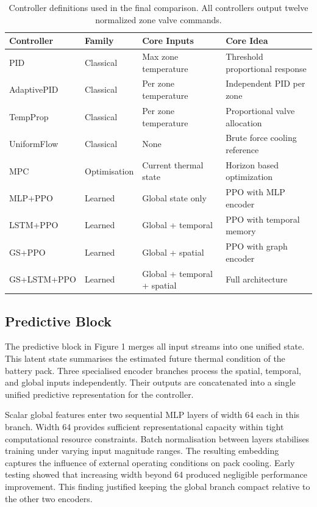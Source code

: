 \documentclass[twocolumn]{article}
\begin{document}
\begin{table}[!tb]
\centering
\caption{Controller definitions used in the final comparison. All controllers output twelve normalized zone valve commands.}\label{tab:controllers}
\small
\renewcommand{\arraystretch}{1.1}
\begin{tabular}{llll}
\hline
Controller & Family & Core Inputs & Core Idea\\
\hline
PID & Classical & Max zone temperature & Threshold proportional response\\
AdaptivePID & Classical & Per zone temperature & Independent PID per zone\\
TempProp & Classical & Per zone temperature & Proportional valve allocation\\
UniformFlow & Classical & None & Brute force cooling reference\\
MPC & Optimisation & Current thermal state & Horizon based optimization\\
MLP+PPO & Learned & Global state only & PPO with MLP encoder\\
LSTM+PPO & Learned & Global + temporal & PPO with temporal memory\\
GS+PPO & Learned & Global + spatial & PPO with graph encoder\\
GS+LSTM+PPO & Learned & Global + temporal + spatial & Full architecture\\
\hline
\end{tabular}
\end{table}

\subsection*{Predictive Block}

The predictive block in Figure 1 merges all input streams into one unified state. This latent state summarises the estimated future thermal condition of the battery pack. Three specialised encoder branches process the spatial, temporal, and global inputs independently. Their outputs are concatenated into a single unified predictive representation for the controller.

Scalar global features enter two sequential MLP layers of width 64 each in this branch. Width 64 provides sufficient representational capacity within tight computational resource constraints. Batch normalisation between layers stabilises training under varying input magnitude ranges. The resulting embedding captures the influence of external operating conditions on pack cooling. Early testing showed that increasing width beyond 64 produced negligible performance improvement. This finding justified keeping the global branch compact relative to the other two encoders.
\end{document}
